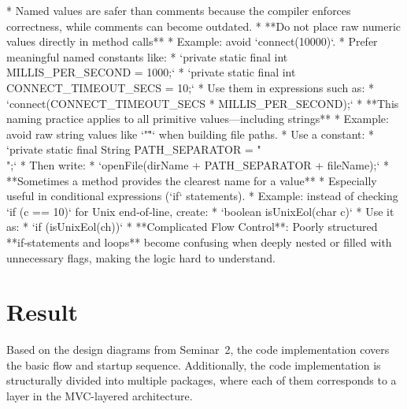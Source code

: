 \documentclass[a4paper]{scrartcl}
\begin{document}
      *   Named values are safer than comments because the compiler enforces correctness, while comments can become outdated.
  *   **Do not place raw numeric values directly in method calls**
      *   Example: avoid `connect(10000)`.
      *   Prefer meaningful named constants like:
          *   `private static final int MILLIS_PER_SECOND = 1000;`
          *   `private static final int CONNECT_TIMEOUT_SECS = 10;`
      *   Use them in expressions such as:
          *   `connect(CONNECT_TIMEOUT_SECS * MILLIS_PER_SECOND);`
  *   **This naming practice applies to all primitive values—including strings**
      *   Example: avoid raw string values like `"\""` when building file paths.
      *   Use a constant:
          *   `private static final String PATH_SEPARATOR = "\\";`
      *   Then write:
          *   `openFile(dirName + PATH_SEPARATOR + fileName);`
  *   **Sometimes a method provides the clearest name for a value**
      *   Especially useful in conditional expressions (`if` statements).
      *   Example: instead of checking `if (c == 10)` for Unix end‑of‑line, create:
          *   `boolean isUnixEol(char c)`
      *   Use it as:
          *   `if (isUnixEol(ch))`
* **Complicated Flow Control**: Poorly structured **if‑statements and loops** become confusing when deeply nested or filled with unnecessary flags, making the logic hard to understand.
\fi


\section{Result}
\label{sec:result}


Based on the design diagrams from Seminar~2, the code implementation covers the basic flow and startup sequence. Additionally, the code implementation is structurally divided into multiple packages, where each of them corresponds to a layer in the MVC-layered architecture. 
\end{document}
